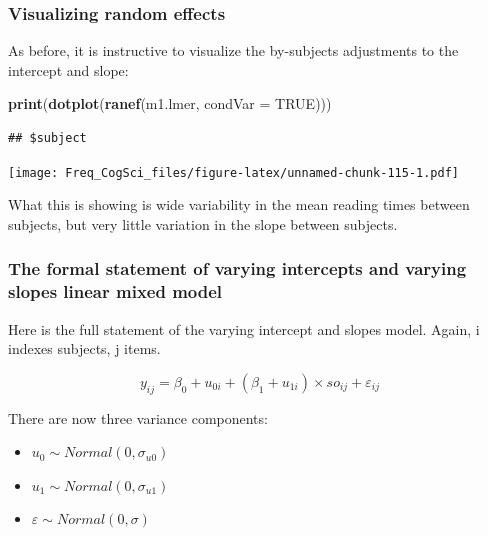 \documentclass[12pt,]{krantz}
\newenvironment{Shaded}{\begin{snugshade}}{\end{snugshade}}
\newcommand{\DataTypeTok}[1]{\textcolor[rgb]{0.13,0.29,0.53}{#1}}
\newcommand{\KeywordTok}[1]{\textcolor[rgb]{0.13,0.29,0.53}{\textbf{#1}}}
\newcommand{\NormalTok}[1]{#1}
\newcommand{\OtherTok}[1]{\textcolor[rgb]{0.56,0.35,0.01}{#1}}
\providecommand{\tightlist}{%
  \setlength{\itemsep}{0pt}\setlength{\parskip}{0pt}}
\begin{document}
\hypertarget{visualizing-random-effects}{%
\subsubsection{Visualizing random effects}\label{visualizing-random-effects}}

As before, it is instructive to visualize the by-subjects adjustments to the intercept and slope:

\begin{Shaded}
\begin{Highlighting}[]
\KeywordTok{print}\NormalTok{(}\KeywordTok{dotplot}\NormalTok{(}\KeywordTok{ranef}\NormalTok{(m1.lmer, }\DataTypeTok{condVar =} \OtherTok{TRUE}\NormalTok{)))}
\end{Highlighting}
\end{Shaded}

\begin{verbatim}
## $subject
\end{verbatim}

\texttt{[image: Freq\_CogSci\_files/figure-latex/unnamed-chunk-115-1.pdf]}

What this is showing is wide variability in the mean reading times between subjects, but very little variation in the slope between subjects.

\hypertarget{the-formal-statement-of-varying-intercepts-and-varying-slopes-linear-mixed-model}{%
\subsubsection{The formal statement of varying intercepts and varying slopes linear mixed model}\label{the-formal-statement-of-varying-intercepts-and-varying-slopes-linear-mixed-model}}

Here is the full statement of the varying intercept and slopes model. Again, i indexes subjects, j items.

\begin{equation}
y_{ij} = \beta_0 + u_{0i}+(\beta_1+u_{1i})\times so_{ij} + \varepsilon_{ij}
\end{equation}

There are now three variance components:

\begin{itemize}
\tightlist
\item
  \(u_0 \sim Normal(0,\sigma_{u0})\)
\item
  \(u_1 \sim Normal(0,\sigma_{u1})\)
\item
  \(\varepsilon \sim Normal(0,\sigma)\)
\end{itemize}
\end{document}
